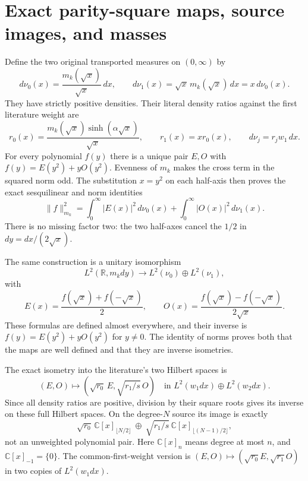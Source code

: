 \documentclass[11pt]{article}
\newcommand{\R}{\mathbb R}
\newcommand{\Pol}{\mathbb C[x]}
\begin{document}
\section{Exact parity-square maps, source images, and masses}

Define the two original transported measures on $(0,\infty)$ by
\begin{equation}\label{eq:nu}
 d\nu_0(x)=\frac{m_k(\sqrt x)}{\sqrt x}\,dx,
 \qquad d\nu_1(x)=\sqrt x\,m_k(\sqrt x)\,dx=x\,d\nu_0(x).
\end{equation}
They have strictly positive densities. Their literal density
ratios against the first literature weight are
\begin{equation}\label{eq:ratios}
 r_0(x)=\frac{m_k(\sqrt x)\sinh(\alpha\sqrt x)}{\sqrt x},
 \qquad r_1(x)=x r_0(x),\qquad d\nu_j=r_jw_1\,dx.
\end{equation}
For every polynomial $f(y)$ there is a unique pair $E,O$ with
$f(y)=E(y^2)+yO(y^2)$. Evenness of $m_k$ makes the cross term in
the squared norm odd. The substitution $x=y^2$ on each half-axis
then proves the exact sesquilinear and norm identities
\begin{equation}\label{eq:parity-norm}
 \|f\|_{m_k}^2=\int_0^\infty|E(x)|^2\,d\nu_0(x)
                    +\int_0^\infty|O(x)|^2\,d\nu_1(x).
\end{equation}
There is no missing factor two: the two half-axes cancel the
$1/2$ in $dy=dx/(2\sqrt x)$.

The same construction is a unitary isomorphism
\[
 L^2(\R,m_kdy)\longrightarrow L^2(\nu_0)\oplus L^2(\nu_1),
\]
with
\[
 E(x)=\frac{f(\sqrt x)+f(-\sqrt x)}2,\qquad
 O(x)=\frac{f(\sqrt x)-f(-\sqrt x)}{2\sqrt x}.
\]
These formulas are defined almost everywhere, and their inverse
is $f(y)=E(y^2)+yO(y^2)$ for $y\ne0$. The identity of norms proves
both that the maps are well defined and that they are inverse
isometries.

The exact isometry into the literature's two Hilbert spaces is
\begin{equation}\label{eq:literature-isometry}
 (E,O)\longmapsto
       \left(\sqrt{r_0}\,E,\sqrt{r_1/s}\,O\right)
 \quad\text{in }L^2(w_1dx)\oplus L^2(w_2dx).
\end{equation}
Since all density ratios are positive, division by their square
roots gives its inverse on these full Hilbert spaces. On the
degree-$N$ source its image is exactly
\[
 \sqrt{r_0}\,\Pol_{\lfloor N/2\rfloor}
       \ \oplus\ \sqrt{r_1/s}\,\Pol_{\lfloor(N-1)/2\rfloor},
\]
not an unweighted polynomial pair. Here $\Pol_n$ means degree at
most $n$, and $\Pol_{-1}=\{0\}$. The common-first-weight version
is $(E,O)\mapsto(\sqrt{r_0}E,\sqrt{r_1}O)$ in two copies of
$L^2(w_1dx)$.
\end{document}

